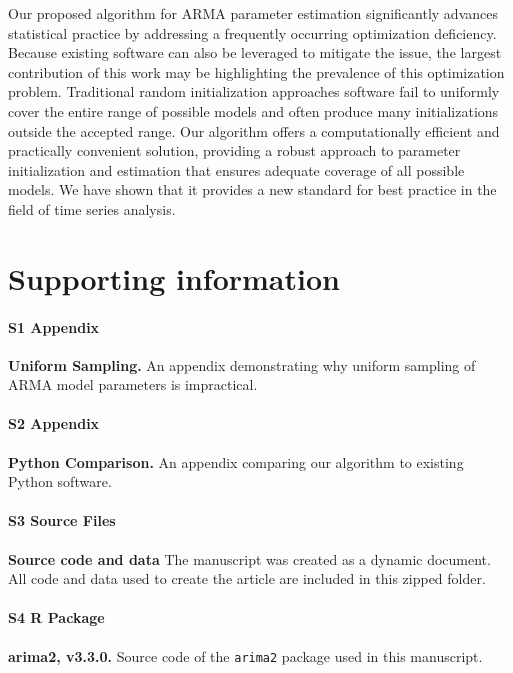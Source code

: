 Our proposed algorithm for ARMA parameter estimation significantly advances statistical practice by addressing a frequently occurring optimization deficiency.
Because existing software can also be leveraged to mitigate the issue, the largest contribution of this work may be highlighting the prevalence of this optimization problem.
Traditional random initialization approaches software fail to uniformly cover the entire range of possible models and often produce many initializations outside the accepted range.
Our algorithm offers a computationally efficient and practically convenient solution, providing a robust approach to parameter initialization and estimation that ensures adequate coverage of all possible models.
We have shown that it provides a new standard for best practice in the field of time series analysis.

\section*{Supporting information}

\paragraph*{S1 Appendix}
\label{S_sampling}
{\bf Uniform Sampling.} An appendix demonstrating why uniform sampling of ARMA model parameters is impractical.

\paragraph*{S2 Appendix}
\label{S_python}
{\bf Python Comparison.} An appendix comparing our algorithm to existing Python software. 

\paragraph*{S3 Source Files}
\label{S_simCode}
{\bf Source code and data} The manuscript was created as a dynamic document. All code and data used to create the article are included in this zipped folder. 

\paragraph*{S4 R Package}
\label{S_source}
{\bf arima2, v3.3.0.} Source code of the \texttt{arima2} package used in this manuscript.

